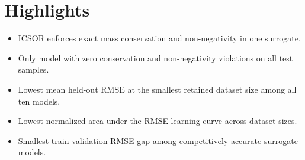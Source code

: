 \documentclass[11pt,a4paper]{article}
\begin{document}
\section*{Highlights}

\begin{itemize}
    \item ICSOR enforces exact mass conservation and non-negativity in one surrogate.
    \item Only model with zero conservation and non-negativity violations on all test samples.
    \item Lowest mean held-out RMSE at the smallest retained dataset size among all ten models.
    \item Lowest normalized area under the RMSE learning curve across dataset sizes.
    \item Smallest train-validation RMSE gap among competitively accurate surrogate models.
\end{itemize}
\end{document}
